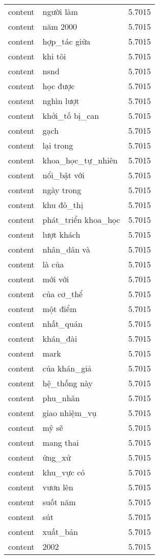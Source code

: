 \documentclass{article}
\begin{document}
\begin{tabular}{lll}
content & người làm & 5.7015\\
content & năm 2000 & 5.7015\\
content & hợp\_tác giữa & 5.7015\\
content & khi tôi & 5.7015\\
content & nsnd & 5.7015\\
content & học được & 5.7015\\
content & nghìn lượt & 5.7015\\
content & khởi\_tố bị\_can & 5.7015\\
content & gạch & 5.7015\\
content & lại trong & 5.7015\\
content & khoa\_học\_tự\_nhiên & 5.7015\\
content & nổi\_bật với & 5.7015\\
content & ngày trong & 5.7015\\
content & khu đô\_thị & 5.7015\\
content & phát\_triển khoa\_học & 5.7015\\
content & lượt khách & 5.7015\\
content & nhân\_dân và & 5.7015\\
content & là của & 5.7015\\
content & mới với & 5.7015\\
content & của cơ\_thể & 5.7015\\
content & một điểm & 5.7015\\
content & nhất\_quán & 5.7015\\
content & khán\_đài & 5.7015\\
content & mark & 5.7015\\
content & của khán\_giả & 5.7015\\
content & hệ\_thống này & 5.7015\\
content & phu\_nhân & 5.7015\\
content & giao nhiệm\_vụ & 5.7015\\
content & mỹ sẽ & 5.7015\\
content & mang thai & 5.7015\\
content & ứng\_xử & 5.7015\\
content & khu\_vực có & 5.7015\\
content & vươn lên & 5.7015\\
content & suốt năm & 5.7015\\
content & sút & 5.7015\\
content & xuất\_bản & 5.7015\\
content & 2002 & 5.7015\\

\end{tabular}
\end{document}
